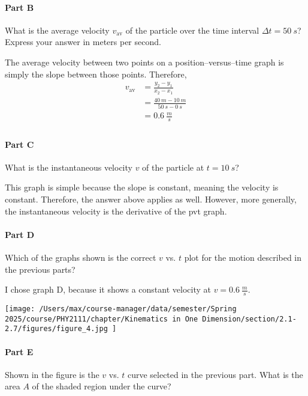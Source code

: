 \paragraph{Part B}
What is the average velocity $v_{\mathrm{av}}$ of the particle over the time interval $\Delta t=\SI{50}{s}$?
Express your answer in meters per second.

\begin{solution}
	The average velocity between two points on a position--versus--time graph is simply the slope between those points. Therefore,
	\begin{align*}
		v_{\mathrm{av}} &= \frac{y_2-y_1}{x_2-x_1} \\
		&= \frac{\SI{40}{m} - \SI{10}{m}}{\SI{50}{s}-\SI{0}{s}} \\
		&= \boxed{\SI{0.6}{\frac{m}{s}}} \\
	\end{align*}
\end{solution}

\paragraph{Part C}
What is the instantaneous velocity $v$ of the particle at $t=\SI{10}{s}$?

\begin{solution}
	This graph is simple because the slope is constant, meaning the velocity is constant. Therefore, the answer above applies as well. However, more generally, the instantaneous velocity is the derivative of the pvt graph.
\end{solution}

\paragraph{Part D}
Which of the graphs shown is the correct $v$ vs. $t$ plot for the motion described in the previous parts?

\begin{solution}
	I chose graph D, because it shows a constant velocity at $v=\SI{0.6}{\frac{m}{s}}$.
	\begin{center}
		\texttt{[image: /Users/max/course-manager/data/semester/Spring 2025/course/PHY2111/chapter/Kinematics in One Dimension/section/2.1-2.7/figures/figure\_4.jpg
		]}
	\end{center}
\end{solution}

\paragraph{Part E}
Shown in the figure is the $v$ vs. $t$ curve selected in the previous part. What is the area $A$ of the shaded region under the curve?

